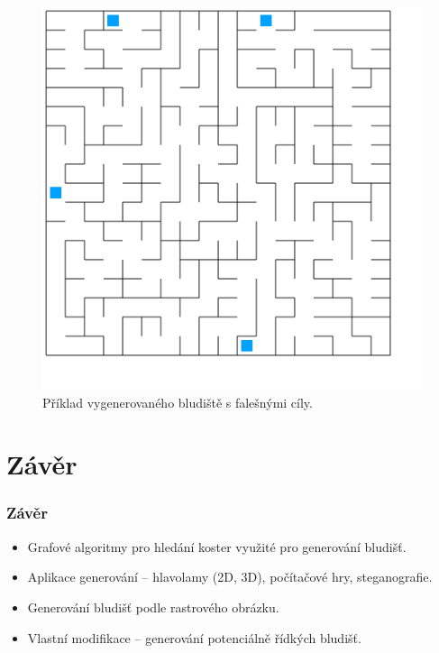 \documentclass{beamer}
\begin{document}
\begin{frame}
  \begin{figure}[h!]
 \centering
 \includegraphics[scale=0.21]{canvas.png}
 \caption{Příklad vygenerovaného bludiště s falešnými cíly.}
 \label{fig:big}
\end{figure}
\end{frame}

\section{Závěr}
\begin{frame}
  \frametitle{Závěr}
  \begin{itemize}
   \setlength\itemsep{1em}
   \item Grafové algoritmy pro hledání koster využité pro generování bludišť.
   \item Aplikace generování -- hlavolamy (2D, 3D), počítačové hry, steganografie.
   \item Generování bludišť podle rastrového obrázku.
   \item Vlastní modifikace -- generování potenciálně řídkých bludišť.
  \end{itemize}

\end{frame}
\end{document}
